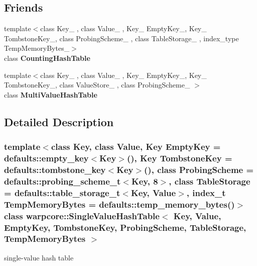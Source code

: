 \subsection*{Friends}
\begin{DoxyCompactItemize}
\item 
\mbox{\label{classwarpcore_1_1SingleValueHashTable_ab68c1d1cdf92eb5e200097df41bb83ab}} 
{\footnotesize template$<$class Key\+\_\+ , class Value\+\_\+ , Key\+\_\+ Empty\+Key\+\_\+, Key\+\_\+ Tombstone\+Key\+\_\+, class Probing\+Scheme\+\_\+ , class Table\+Storage\+\_\+ , index\+\_\+type Temp\+Memory\+Bytes\+\_\+$>$ }\\class {\bfseries Counting\+Hash\+Table}
\item 
\mbox{\label{classwarpcore_1_1SingleValueHashTable_a07a95b74f26df6e554460b8ac6eb40ca}} 
{\footnotesize template$<$class Key\+\_\+ , class Value\+\_\+ , Key\+\_\+ Empty\+Key\+\_\+, Key\+\_\+ Tombstone\+Key\+\_\+, class Value\+Store\+\_\+ , class Probing\+Scheme\+\_\+ $>$ }\\class {\bfseries Multi\+Value\+Hash\+Table}
\end{DoxyCompactItemize}


\subsection{Detailed Description}
\subsubsection*{template$<$class Key, class Value, Key Empty\+Key = defaults\+::empty\+\_\+key$<$\+Key$>$(), Key Tombstone\+Key = defaults\+::tombstone\+\_\+key$<$\+Key$>$(), class Probing\+Scheme = defaults\+::probing\+\_\+scheme\+\_\+t$<$\+Key, 8$>$, class Table\+Storage = defaults\+::table\+\_\+storage\+\_\+t$<$\+Key, Value$>$, index\+\_\+t Temp\+Memory\+Bytes = defaults\+::temp\+\_\+memory\+\_\+bytes()$>$\newline
class warpcore\+::\+Single\+Value\+Hash\+Table$<$ Key, Value, Empty\+Key, Tombstone\+Key, Probing\+Scheme, Table\+Storage, Temp\+Memory\+Bytes $>$}

single-\/value hash table 


